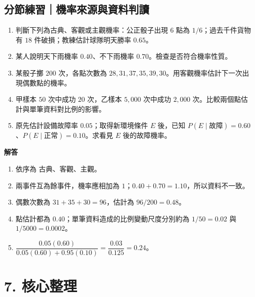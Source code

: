 \documentclass[11pt,a4paper]{article}
\providecommand{\tightlist}{%
  \setlength{\itemsep}{0pt}\setlength{\parskip}{0pt}}
\begin{document}
\begin{HandoutSelfCheck}

\subsection{分節練習｜機率來源與資料判讀}\label{ux5206ux7bc0ux7df4ux7fd2ux6a5fux7387ux4f86ux6e90ux8207ux8cc7ux6599ux5224ux8b80}

\begin{enumerate}
\def\labelenumi{\arabic{enumi}.}
\tightlist
\item
  判斷下列為古典、客觀或主觀機率：公正骰子出現 6 點為 \(1/6\)；過去千件貨物有 \(18\) 件破損；教練估計球隊明天勝率 \(0.65\)。
\item
  某人說明天下雨機率 \(0.40\)、不下雨機率 \(0.70\)。檢查是否符合機率性質。
\item
  某骰子擲 \(200\) 次，各點次數為 \(28,31,37,35,39,30\)。用客觀機率估計下一次出現偶數點的機率。
\item
  甲樣本 \(50\) 次中成功 \(20\) 次，乙樣本 \(5{,}000\) 次中成功 \(2{,}000\) 次。比較兩個點估計與單筆資料對比例的影響。
\item
  原先估計設備故障率 \(0.05\)；取得新環境條件 \(E\) 後，已知 \(P(E\mid \text{故障})=0.60\)、\(P(E\mid \text{正常})=0.10\)。求看見 \(E\) 後的故障機率。
\end{enumerate}

\textbf{解答}

\begin{enumerate}
\def\labelenumi{\arabic{enumi}.}
\tightlist
\item
  依序為 \(\boxed{\text{古典、客觀、主觀}}\)。
\item
  兩事件互為餘事件，機率應相加為 \(1\)；\(0.40+0.70=1.10\)，所以資料不一致。
\item
  偶數次數為 \(31+35+30=96\)，估計為 \(\boxed{96/200=0.48}\)。
\item
  點估計都為 \(0.40\)；單筆資料造成的比例變動尺度分別約為 \(1/50=0.02\) 與 \(1/5000=0.0002\)。
\item
  \(\dfrac{0.05(0.60)}{0.05(0.60)+0.95(0.10)}=\dfrac{0.03}{0.125}=\boxed{0.24}\)。
\end{enumerate}

\end{HandoutSelfCheck}

\section{7. 核心整理}\label{ux6838ux5fc3ux6574ux7406}
\end{document}
